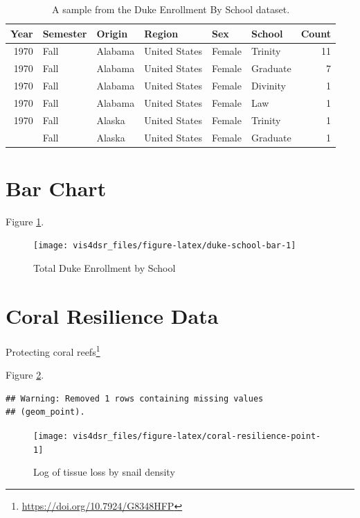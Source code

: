 \documentclass[
]{krantz}
\renewcommand{\href}[2]{#2\footnote{\url{#1}}}
\begin{document}
\begin{table}

\caption{\label{tab:duke-school-tab}A sample from the Duke Enrollment By School dataset.}
\centering
\begin{tabular}[t]{rlllllr}
\toprule
Year & Semester & Origin & Region & Sex & School & Count\\
\midrule
1970 & Fall & Alabama & United States & Female & Trinity & 11\\
1970 & Fall & Alabama & United States & Female & Graduate & 7\\
1970 & Fall & Alabama & United States & Female & Divinity & 1\\
1970 & Fall & Alabama & United States & Female & Law & 1\\
1970 & Fall & Alaska & United States & Female & Trinity & 1\\
\addlinespace
1970 & Fall & Alaska & United States & Female & Graduate & 1\\
\bottomrule
\end{tabular}
\end{table}

\hypertarget{bar-chart-1}{%
\section{Bar Chart}\label{bar-chart-1}}

Figure \ref{fig:duke-school-bar}.

\begin{figure}
\texttt{[image: vis4dsr\_files/figure-latex/duke-school-bar-1]} \caption{Total Duke Enrollment by School}\label{fig:duke-school-bar}
\end{figure}

\hypertarget{coral-resilience-data}{%
\section*{Coral Resilience Data}\label{coral-resilience-data}}


\href{https://doi.org/10.7924/G8348HFP}{Protecting coral reefs}

Figure \ref{fig:coral-resilience-point}.

\begin{verbatim}
## Warning: Removed 1 rows containing missing values
## (geom_point).
\end{verbatim}

\begin{figure}
\texttt{[image: vis4dsr\_files/figure-latex/coral-resilience-point-1]} \caption{Log of tissue loss by snail density}\label{fig:coral-resilience-point}
\end{figure}
\end{document}
